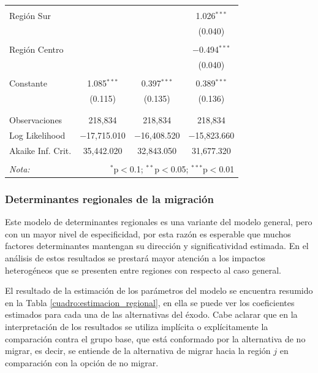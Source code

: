 \documentclass[12pt,a4paper]{article}
\begin{document}
\begin{table}[!htbp]
\begin{tabular}{@{\extracolsep{5pt}}lccc}
  & & & \\ 
 Región Sur &  &  & 1.026$^{***}$ \\ 
  &  &  & (0.040) \\ 
  & & & \\ 
 Región Centro &  &  & $-$0.494$^{***}$ \\ 
  &  &  & (0.040) \\ 
  & & & \\ 
 Constante & 1.085$^{***}$ & 0.397$^{***}$ & 0.389$^{***}$ \\ 
  & (0.115) & (0.135) & (0.136) \\ 
  & & & \\ 
\hline \\[-1.8ex] 
Observaciones & 218,834 & 218,834 & 218,834 \\ 
Log Likelihood & $-$17,715.010 & $-$16,408.520 & $-$15,823.660 \\ 
Akaike Inf. Crit. & 35,442.020 & 32,843.050 & 31,677.320 \\ 
\hline 
\hline \\[-1.8ex] 
\textit{Nota:}  & \multicolumn{3}{r}{$^{*}$p$<$0.1; $^{**}$p$<$0.05; $^{***}$p$<$0.01} \\ 
\end{tabular} 
\end{table} 



\subsubsection{Determinantes regionales de la migración}
Este modelo de determinantes regionales es una variante del modelo general, pero con un mayor nivel de especificidad, por esta razón es esperable que muchos factores determinantes mantengan su dirección y significatividad estimada. En el análisis de estos resultados se prestará mayor atención a los impactos heterogéneos que se presenten entre regiones con respecto al caso general.

El resultado de la estimación de los parámetros del modelo se encuentra resumido en la Tabla \ref{cuadro:estimacion_regional}, en ella se puede ver los coeficientes estimados para cada una de las alternativas del éxodo. Cabe aclarar que en la interpretación de los resultados se utiliza implícita o explícitamente la comparación contra el grupo base, que está conformado por la alternativa de no migrar, es decir, se entiende de la alternativa de migrar hacia la región $j$ en comparación con la opción de no migrar.
\end{document}
